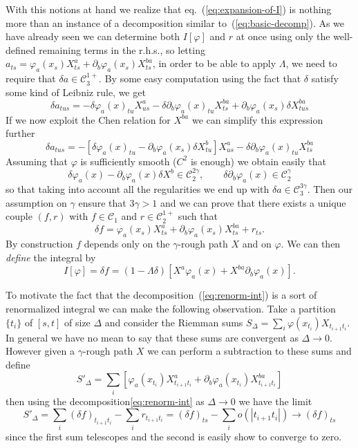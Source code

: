 \documentclass[a4paper]{article}
\newcommand{\1}{{\bf 1}}
\newcommand{\der}{\delta}
\newcommand{\CC}{\mathcal{C}}
\newcommand{\CC}{\mathcal{C}}
\newcommand{\der}{\delta}
\begin{document}
With this notions at hand we realize that eq.~(\ref{eq:expansion-of-I}) is nothing more
than an instance of a decomposition similar
to~(\ref{eq:basic-decomp}). As we have already seen we can determine
both $I[\varphi]$ and $r$ at once using only the well-defined
remaining terms in the
r.h.s., so letting $a_{ts} =  \varphi_a(x_s) X^a_{ts} + \partial_b
\varphi_a(x_s) X^{b a}_{ts} $, in order to be able to
apply $\Lambda$, we need to require that
$\der a \in \CC_3^{1+}$. By some easy computation using
the fact that $\der$ satisfy some kind of Leibniz rule, we
get
$$
\der a_{tus} =  - \der \varphi_a(x)_{tu} X^a_{us} -  \der \partial_b
\varphi_a(x)_{tu} X^{b a}_{ts} +  \partial_b
\varphi_a(x_s) \der X^{b a}_{tus}
$$
If we now exploit the Chen relation for $X^{b a}$ we can
simplify this expression further
\begin{equation}
\label{eq:step-2-obstruction}
\der a_{tus} =  - [\der \varphi_a(x)_{tu} -  \partial_b
\varphi_a(x_s) \der X^{b}_{tu} ]X^a_{us} -  \der \partial_b
\varphi_a(x)_{tu} X^{b a}_{ts} 
\end{equation}
Assuming that $\varphi$ is sufficiently smooth ($C^2$ is enough) we
obtain easily that
$$
\der \varphi_a(x) -  \partial_b
\varphi_a(x) \der X^{b} \in \CC_2^{2\gamma}, \qquad
 \der \partial_b
\varphi_a(x) \in \CC^\gamma_2
$$
so that taking into account all the regularities we end up with $\der
a \in \CC^{3\gamma}_3$. Then our assumption on $\gamma$ ensure that
$3\gamma > 1$ and we can prove that there exists a unique couple
$(f,r)$ with $f \in \CC_1$ and $r \in \CC_2^{1+}$ such
that
\begin{equation}
\label{eq:renorm-int}
\der f = \varphi_a(x_s) X^a_{ts} + \partial_b
\varphi_a(x_s) X^{b a}_{ts} + r_{ts}.
\end{equation}
By construction $f$ depends only on the $\gamma$-rough path $X$ and on
$\varphi$. We can then  \emph{define} the integral by $$I[\varphi] =
\der f=   (1-\Lambda \der)[ X^a \varphi_a(x)  + X^{b a} \partial_b
\varphi_a(x) ].$$

To motivate the fact that the decomposition~(\ref{eq:renorm-int}) is a sort of renormalized integral we can make the following observation. Take a partition $\{t_i\}$ of $[s,t]$ of size $\Delta$ and consider the Riemman sums $S_\Delta = \sum_i \varphi(x_{t_i}) X_{t_{i+1} t_i}$. In general we have no mean to say that these sums are convergent as $\Delta \to 0$. However given a $\gamma$-rough path $X$ we can perform a subtraction to these sums and define
$$
S'_\Delta = \sum_i \left[ \varphi_a(x_{t_i}) X^a_{t_{i+1} t_i} +  \partial_b
\varphi_a(x_{t_i}) X^{b a}_{t_{i+1} t_i}\right]
$$
then using the decomposition\ref{eq:renorm-int} as $\Delta \to 0$ we have the limit
$$
S'_\Delta = \sum_i (\der f)_{t_{i+1} t_i} - \sum_i r_{t_{i+1} t_i} = (\der f)_{t s} - \sum_i o(|t_{i+1} t_i|) \to (\der f)_{t s} 
$$
since the first sum telescopes and the second is easily show to converge to zero. 
\end{document}
